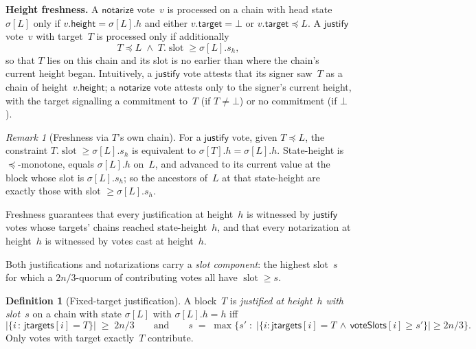 \ifx\litemode\undefined\documentclass{article}\fi
\newcommand{\slot}[0]{\ensuremath{\operatorname{\mathrm{slot}}}}
\newcommand{\target}{\mathsf{target}}
\newcommand{\height}{\mathsf{height}}
\newcommand{\just}{\ensuremath{\mathsf{justify}}\xspace}
\newcommand{\notar}{\ensuremath{\mathsf{notarize}}\xspace}
\newcommand{\jtargets}{\mathsf{jtargets}}
\newcommand{\voteSlots}{\mathsf{voteSlots}}
\renewcommand{\paragraph}[1]{\vspace{7pt}\noindent\textbf{#1}}
\theoremstyle{plain}
\theoremstyle{definition}
\newtheorem{definition}[theorem]{Definition}
\theoremstyle{remark}
\newtheorem{remark}[theorem]{Remark}
\begin{document}
\paragraph{Height freshness.}
A \notar vote~$v$ is processed on a chain with head state $\sigma[L]$ only if $v.\height = \sigma[L].h$ and either $v.\target = \bot$ or $v.\target \preceq L$.
A \just vote~$v$ with target~$T$ is processed only if additionally
\[
  T \preceq L \;\wedge\; T.\slot \geq \sigma[L].s_h,
\]
so that $T$ lies on this chain and its slot is no earlier than where the chain's current height began.
Intuitively, a \just vote attests that its signer saw~$T$ as a chain of height~$v.\height$; a \notar vote attests only to the signer's current height, with the target signalling a commitment to~$T$ (if $T \neq \bot$) or no commitment (if $\bot$).

\begin{remark}[Freshness via $T$'s own chain]\label{rem:fresh-equiv}
For a \just vote, given $T \preceq L$, the constraint $T.\slot \geq \sigma[L].s_h$ is equivalent to $\sigma[T].h = \sigma[L].h$.
State-height is $\preceq$-monotone, equals $\sigma[L].h$ on~$L$, and advanced to its current value at the block whose slot is $\sigma[L].s_h$; so the ancestors of~$L$ at that state-height are exactly those with slot $\geq \sigma[L].s_h$.
\end{remark}

Freshness guarantees that every justification at height~$h$ is witnessed by \just votes whose targets' chains reached state-height~$h$, and that every notarization at height~$h$ is witnessed by votes cast at height~$h$.

Both justifications and notarizations carry a \emph{slot component}: the highest slot~$s$ for which a $2n/3$-quorum of contributing votes all have $\slot \geq s$.

\begin{definition}[Fixed-target justification]\label{def:justification}
A block~$T$ is \emph{justified at height~$h$ with slot~$s$} on a chain with state $\sigma[L]$ with $\sigma[L].h = h$ iff
\[
  \bigl|\{i \,:\, \jtargets[i] = T\}\bigr| \;\geq\; 2n/3
  \qquad\text{and}\qquad
  s \;=\; \max\bigl\{s' \;:\; |\{i : \jtargets[i] = T \,\wedge\, \voteSlots[i] \geq s'\}| \geq 2n/3\bigr\}.
\]
Only votes with target exactly~$T$ contribute.
\end{definition}
\end{document}
